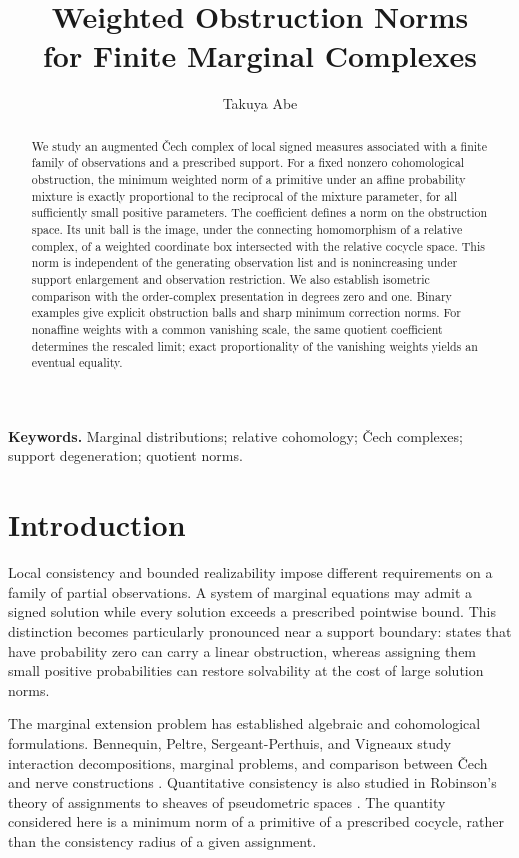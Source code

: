 \documentclass[11pt,a4paper]{article}
\title{Weighted Obstruction Norms\texorpdfstring{\\}{ }for Finite Marginal Complexes}
\author{Takuya Abe}
\date{}
\numberwithin{equation}{section}
\theoremstyle{remark}
\begin{document}
\maketitle
\begin{abstract}
We study an augmented \v{C}ech complex of local signed measures associated with a finite family of observations and a prescribed support. For a fixed nonzero cohomological obstruction, the minimum weighted norm of a primitive under an affine probability mixture is exactly proportional to the reciprocal of the mixture parameter, for all sufficiently small positive parameters. The coefficient defines a norm on the obstruction space. Its unit ball is the image, under the connecting homomorphism of a relative complex, of a weighted coordinate box intersected with the relative cocycle space. This norm is independent of the generating observation list and is nonincreasing under support enlargement and observation restriction. We also establish isometric comparison with the order-complex presentation in degrees zero and one. Binary examples give explicit obstruction balls and sharp minimum correction norms. For nonaffine weights with a common vanishing scale, the same quotient coefficient determines the rescaled limit; exact proportionality of the vanishing weights yields an eventual equality.
\end{abstract}
\noindent\textbf{Keywords.} Marginal distributions; relative cohomology; \v{C}ech complexes; support degeneration; quotient norms.

\section{Introduction}
Local consistency and bounded realizability impose different requirements on a family of partial observations. A system of marginal equations may admit a signed solution while every solution exceeds a prescribed pointwise bound. This distinction becomes particularly pronounced near a support boundary: states that have probability zero can carry a linear obstruction, whereas assigning them small positive probabilities can restore solvability at the cost of large solution norms.

The marginal extension problem has established algebraic and cohomological formulations. Bennequin, Peltre, Sergeant-Perthuis, and Vigneaux study interaction decompositions, marginal problems, and comparison between \v{C}ech and nerve constructions \cite[Sections~5--6]{BPSV}. Quantitative consistency is also studied in Robinson's theory of assignments to sheaves of pseudometric spaces \cite[Definitions~7 and~9]{Robinson}. The quantity considered here is a minimum norm of a primitive of a prescribed cocycle, rather than the consistency radius of a given assignment.
\end{document}
